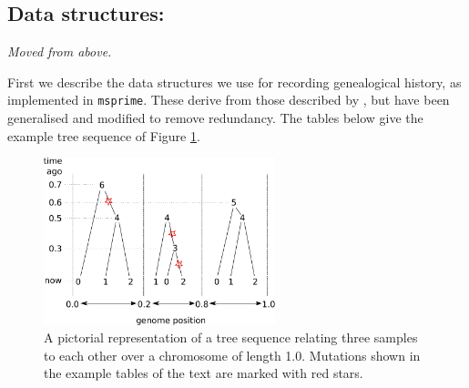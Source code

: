 \documentclass{article}
\newcommand{\msprime}{\texttt{msprime}}
\newcommand{\jk}[1]{{\em \color{red} #1}}
\begin{document}


\appendix

\subsection*{Data structures:}
\jk{Moved from above.}

First we describe the data structures we use for recording genealogical history,
as implemented in \msprime.
These derive from those described by \citet{kelleher2016efficient},
but have been generalised and modified to remove redundancy.
The tables below give the example tree sequence of Figure \ref{fig:ex_tree_seq}.

\begin{figure}
    \begin{center}
        \includegraphics[width=0.6\textwidth]{example_tree_seq}
    \end{center}
    \caption{
        A pictorial representation of a tree sequence
        relating three samples to each other
        over a chromosome of length 1.0.
        Mutations shown in the example tables of the text
        are marked with red stars.
        \label{fig:ex_tree_seq}
    }
\end{figure}
\end{document}
